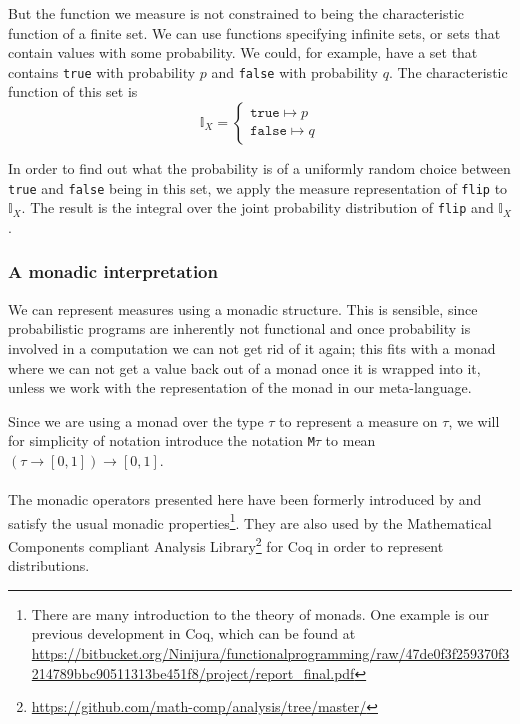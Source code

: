 \documentclass[11pt, leqno, titlepage]{article}
\theoremstyle{definition}
\begin{document}
But the function we measure is not constrained to being the characteristic function
of a finite set. We can use functions specifying infinite sets, or sets that contain
values with some probability. 
We could, for example, have a set that contains \texttt{true} with
probability $p$ and \texttt{false} with probability $q$.
The characteristic function of this set is
$$\mathbb{I}_X =
\begin{cases}
  \texttt{true} \mapsto p\\
  \texttt{false} \mapsto q
\end{cases}$$
 
In order to find out what the probability is of a uniformly random choice between
\texttt{true} and \texttt{false} being in this set, we apply the measure
representation of \texttt{flip} to $\mathbb{I}_X$. The result is the integral over
the joint probability distribution of \texttt{flip} and $\mathbb{I}_X$. 

\subsubsection{A monadic interpretation}
\label{sec:monad-interp}
We can represent measures using a monadic structure. This is sensible, since
probabilistic programs are inherently not functional and once probability is involved
in a computation we can not get rid of it again; this fits with a monad where we can
not get a value back out of a monad once it is wrapped into it, unless we work with
the representation of the monad in our meta-language.

Since we are using a monad over the type $\tau$ to represent a measure on $\tau$, we
will for simplicity of notation introduce the notation \texttt{M}$\tau$ to mean 
$(\tau\to[0,1])\to[0,1]$.\\ 
\\
The monadic operators presented here have been formerly introduced by \cite{rml-paper}
and satisfy the usual monadic properties\footnote{There are many introduction to the
theory of monads. One example is our previous development in Coq, which can be found
at
\url{https://bitbucket.org/Ninijura/functionalprogramming/raw/47de0f3f259370f3214789bbc90511313be451f8/project/report_final.pdf}}. They
are also used by the Mathematical Components compliant Analysis Library\footnote
{\url{https://github.com/math-comp/analysis/tree/master/}} for Coq in order to
represent distributions.
\end{document}
